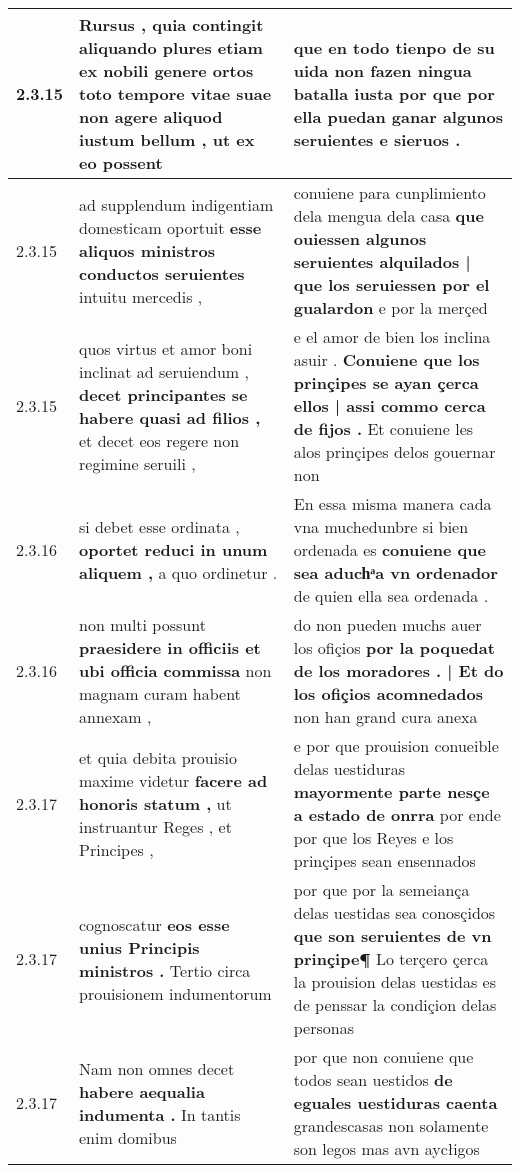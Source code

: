 \begin{tabular}{|p{1cm}|p{6.5cm}|p{6.5cm}|}
2.3.15 & Rursus , quia contingit aliquando plures etiam ex nobili genere ortos toto tempore vitae suae \textbf{ non agere aliquod iustum bellum , } ut ex eo possent & que en todo tienpo de su uida \textbf{ non fazen ningua batalla iusta } por que por ella puedan ganar algunos seruientes e sieruos . \\\hline
2.3.15 & ad supplendum indigentiam domesticam oportuit \textbf{ esse aliquos ministros conductos seruientes } intuitu mercedis , & conuiene para cunplimiento dela mengua dela casa \textbf{ que ouiessen algunos seruientes alquilados | que los seruiessen por el gualardon } e por la merçed \\\hline
2.3.15 & quos virtus et amor boni inclinat ad seruiendum , \textbf{ decet principantes se habere quasi ad filios , } et decet eos regere non regimine seruili , & e el amor de bien los inclina asuir . \textbf{ Conuiene que los prinçipes se ayan çerca ellos | assi commo cerca de fijos . } Et conuiene les alos prinçipes delos gouernar non \\\hline
2.3.16 & si debet esse ordinata , \textbf{ oportet reduci in unum aliquem , } a quo ordinetur . & En essa misma manera cada vna muchedunbre si bien ordenada es \textbf{ conuiene que sea aduchͣa vn ordenador } de quien ella sea ordenada . \\\hline
2.3.16 & non multi possunt \textbf{ praesidere in officiis et ubi officia commissa } non magnam curam habent annexam , & do non pueden muchs auer los ofiçios \textbf{ por la poquedat de los moradores . | Et do los ofiçios acomnedados } non han grand cura anexa \\\hline
2.3.17 & et quia debita prouisio maxime videtur \textbf{ facere ad honoris statum , } ut instruantur Reges , et Principes , & e por que prouision conueible delas uestiduras \textbf{ mayormente parte nesçe a estado de onrra } por ende por que los Reyes e los prinçipes sean ensennados \\\hline
2.3.17 & cognoscatur \textbf{ eos esse unius Principis ministros . } Tertio circa prouisionem indumentorum & por que por la semeiança delas uestidas sea conosçidos \textbf{ que son seruientes de vn prinçipe¶ } Lo terçero çerca la prouision delas uestidas es de penssar la condiçion delas personas \\\hline
2.3.17 & Nam non omnes decet \textbf{ habere aequalia indumenta . } In tantis enim domibus & por que non conuiene que todos sean uestidos \textbf{ de eguales uestiduras caenta } grandescasas non solamente son legos mas avn aycłigos \\\hline

\end{tabular}
